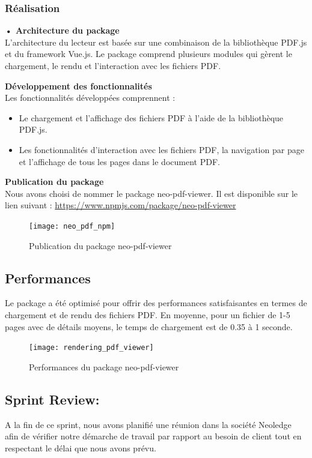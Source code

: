 \subsubsection{Réalisation}

\textbf{•	Architecture du package}\\
L'architecture du lecteur est basée sur une combinaison de la bibliothèque PDF.js et du framework Vue.js. Le package comprend plusieurs modules qui gèrent le chargement, le rendu et l'interaction avec les fichiers PDF.

\textbf{Développement des fonctionnalités }\\
Les fonctionnalités développées comprennent :

\begin{itemize}
  \item Le chargement et l'affichage des fichiers PDF à l'aide de la bibliothèque PDF.js.
  \item Les fonctionnalités d'interaction avec les fichiers PDF, la navigation par page et l'affichage de tous les pages dans le document PDF.
\end{itemize}

\textbf{Publication du package}\\
Nous avons choisi de nommer le package neo-pdf-viewer. Il est disponible sur le lien suivant : \url{https://www.npmjs.com/package/neo-pdf-viewer}

\begin{figure}
  \centering
  \texttt{[image: neo\_pdf\_npm]}
  \caption{Publication du package neo-pdf-viewer}
  \label{fig:npm_package}
\end{figure}

\subsection{Performances}
Le package a été optimisé pour offrir des performances satisfaisantes en termes de chargement et de rendu des fichiers PDF.
En moyenne, pour un fichier de 1-5 pages avec de détails moyens, le temps de chargement est de 0.35 à 1 seconde.

\begin{figure}[H]
  \centering
  \texttt{[image: rendering\_pdf\_viewer]}
  \caption{Performances du package neo-pdf-viewer}
  \label{fig:performance_package}
\end{figure}


\subsection{Sprint Review:}
A la fin de ce sprint, nous avons planifié une réunion dans la société Neoledge afin de vérifier notre démarche de travail par rapport au besoin de client tout en respectant le délai que nous avons prévu.

